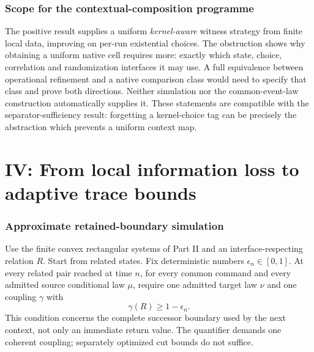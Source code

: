 \documentclass[11pt]{article}
\begin{document}
\section{Scope for the contextual-composition programme}
The positive result supplies a uniform \emph{kernel-aware} witness strategy from finite local data, improving on per-run existential choices. The obstruction shows why obtaining a uniform native cell requires more: exactly which state, choice, correlation and randomization interfaces it may use. A full equivalence between operational refinement and a native comparison class would need to specify that class and prove both directions. Neither simulation nor the common-event-law construction automatically supplies it. These statements are compatible with the separator-sufficiency result: forgetting a kernel-choice tag can be precisely the abstraction which prevents a uniform context map.
\part{IV: From local information loss to adaptive trace bounds}
\section{Approximate retained-boundary simulation}
Use the finite convex rectangular systems of Part II and an interface-respecting relation $R$. Start from related states. Fix deterministic numbers $\epsilon_n\in[0,1]$. At every related pair reached at time $n$, for every common command and every admitted source conditional law $\mu$, require one admitted target law $\nu$ and one coupling $\gamma$ with
\[
 \gamma(R)\ge 1-\epsilon_n.
\]
This condition concerns the complete successor boundary used by the next context, not only an immediate return value. The quantifier demands one coherent coupling; separately optimized cut bounds do not suffice.
\end{document}
